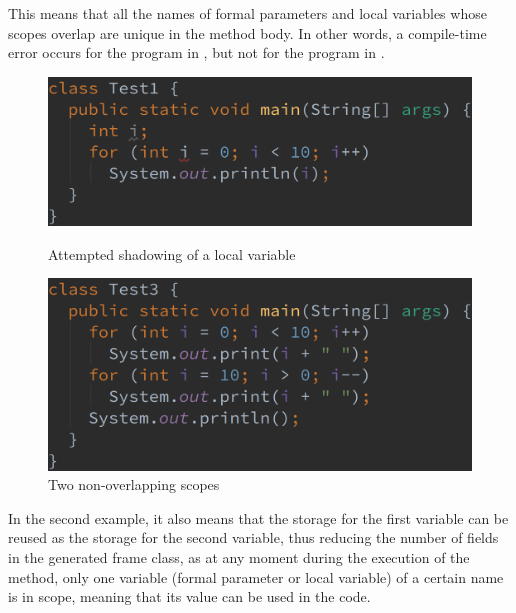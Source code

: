This means that all the names of formal parameters and local variables whose scopes overlap are unique in the method
body. In other words, a compile-time error occurs for the program in
, but not for the program in
.

\begin{figure}[htb]
    \centering
    \begin{minipage}[b]{0.45\textwidth}
        \centering
        \includegraphics[width=\textwidth]{src/img/attempted-shadowing-of-a-local-variable.png}
        \caption{Attempted shadowing of a local variable \label{img:attempted-shadowing-of-a-local-variable}}
    \end{minipage}
    \hfill
    \begin{minipage}[b]{0.45\textwidth}
        \centering
        \includegraphics[width=\textwidth]{src/img/no-shadow.png}
        \caption{Two non-overlapping scopes \label{img:no-shadow}}
    \end{minipage}
\end{figure}

In the second example, it also means that the storage for the first  variable can be reused as the storage for
the second  variable, thus reducing the number of fields in the generated frame class, as at any moment during
the execution of the method, only one variable (formal parameter or local variable) of a certain name is in scope,
meaning that its value can be used in the code.

